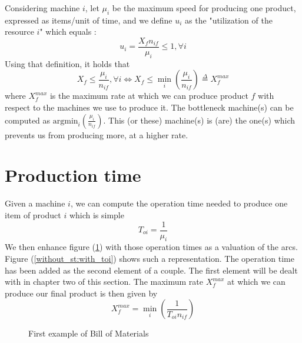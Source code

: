 Considering machine $i$, let $\mu_i$ be the maximum speed for producing one product, expressed as items/unit of time, and we define $u_i$ as the "utilization of the resource $i$" which equals : \[ u_i = \frac{X_fn_{if}}{\mu_i}\le 1, \forall i \] Using that definition, it holds that \[ X_f\le\frac{\mu_i}{n_{if}}, \forall i\Leftrightarrow X_f\le\min_i\left( \frac{\mu_i}{n_{if}} \right) \overset{\Delta}{=} X_f^{max} \] where $X_f^{max}$ is the maximum rate at which we can produce product $f$ with respect to the machines we use to produce it. The bottleneck machine(s) can be computed as $\textrm{argmin}_i\left( \frac{\mu_i}{n_{if}} \right)$. This (or these) machine(s) is (are) the one(s) which prevents us from producing more, at a higher rate. 

\section{Production time}

Given a machine $i$, we can compute the operation time needed to produce one item of product $i$ which is simple \[ T_{oi} = \frac{1}{\mu_i} \] We then enhance figure (\ref{without_st:first_example}) with those operation times as a valuation of the arcs. Figure (\ref{without_st:with_toi}) shows such a representation. The operation time has been added as the second element of a couple. The first element will be dealt with in chapter two of this section. The maximum rate $X_f^{max}$ at which we can produce our final product is then given by \[ X_f^{max} = \min_i\left( \frac{1}{T_{oi}n_{if}} \right) \]

\begin{figure}[h!]
    \centering
    \caption{\label{without_st:first_example}First example of Bill of Materials}
\end{figure}

